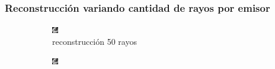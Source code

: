 \documentclass[11pt]{beamer}
\begin{document}
\begin{frame}
    \frametitle{Reconstrucción variando cantidad de rayos por emisor}
    
    \begin{figure}[H]
        \centering
    
        \begin{subfigure}[h]{0.3\textwidth} 
            \includegraphics[width=\textwidth]{img/tomo_rayos_50.png}
            \caption{reconstrucción 50 rayos}
            \label{fig:reconstruccion 50 rayos}
        \end{subfigure}%
        \hfill
        \begin{subfigure}[h]{0.3\textwidth}
            \includegraphics[width=\textwidth]{img/tomo_rayos_100.png}

\end{subfigure}
\end{figure}
\end{frame}
\end{document}

